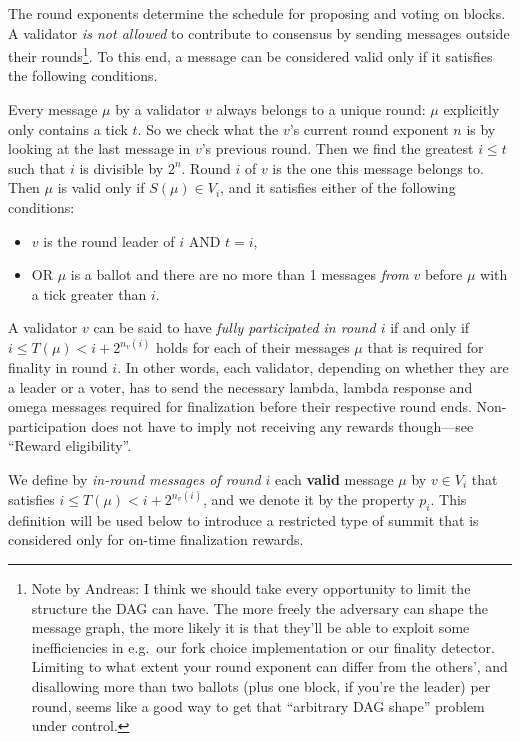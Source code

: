 \documentclass[12pt]{article}
\begin{document}
The round exponents determine the schedule for proposing and voting on blocks. A validator \emph{is not allowed} to contribute to consensus by sending messages outside their rounds\footnote{Note by Andreas: I think we should take every opportunity to limit the structure the DAG can have. The more freely the adversary can shape the message graph, the more likely it is that they'll be able to exploit some inefficiencies in e.g.~our fork choice implementation or our finality detector. Limiting to what extent your round exponent can differ from the others', and disallowing more than two ballots (plus one block, if you're the leader) per round, seems like a good way to get that ``arbitrary DAG shape'' problem under control.}. To this end, a message can be considered valid only if it satisfies the following conditions.

Every message $\mu$ by a validator $v$ always belongs to a unique round: $\mu$ explicitly only contains a tick $t$. So we check what the $v$'s current round exponent $n$ is by looking at the last message in $v$'s previous round. Then we find the greatest $i\leq t$ such that $i$ is divisible by $2^n$. Round $i$ of $v$ is the one this message belongs to. Then $\mu$ is valid only if $S(\mu)\in V_i$, and it satisfies either of the following conditions:

\begin{itemize}
\item
  $v$ is the round leader of $i$ AND $t = i$,
\item
  OR $\mu$ is a ballot and there are no more than 1 messages
  \emph{from} $v$ before $\mu$ with a tick greater than $i$.
\end{itemize}

A validator $v$ can be said to have \emph{fully participated in round $i$} if and only if $i \leq T(\mu) <i+2^{n_v(i)}$ holds for each of their messages $\mu$ that is required for finality in round $i$. In other words, each validator, depending on whether they are a leader or a voter, has to send the necessary lambda, lambda response and omega messages required for finalization before their respective round ends. Non-participation does not have to imply not receiving any rewards though---see ``Reward eligibility''.

We define by \emph{in-round messages of round $i$} each \textbf{valid} message $\mu$ by $v\in V_i$ that satisfies $i \leq T(\mu)< i+2^{n_v(i)}$, and we denote it by the property $p_i$. This definition will be used below to introduce a restricted type of summit that is considered only for on-time finalization rewards.
\end{document}

